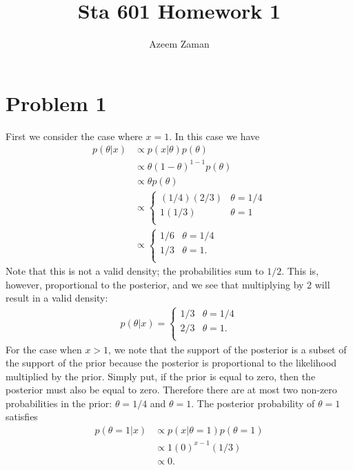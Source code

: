 \documentclass[a4paper,10pt]{article}
\title{Sta 601 Homework 1}
\author{Azeem Zaman}
\begin{document}
\maketitle

\section{Problem 1}
First we consider the case where $x=1$.  In this case we have
\begin{align*}
 p(\theta|x) &\propto p(x|\theta)p(\theta) \\
 &\propto \theta(1-\theta)^{1-1}p(\theta) \\
 &\propto \theta p(\theta) \\
  &\propto \begin{cases}
           (1/4)(2/3) & \theta = 1/4 \\
           1(1/3) & \theta = 1 \\
          \end{cases} \\
  &\propto \begin{cases}
           1/6& \theta = 1/4 \\
           1/3 & \theta = 1. \\
          \end{cases}
\end{align*}
Note that this is not a valid density; the probabilities sum to $1/2$.  This is, however, proportional to the posterior, and we see that multiplying by 2 will result in a valid density:
\begin{align*}
 p(\theta|x) = \begin{cases}
                1/3 & \theta = 1/4 \\
                2/3 & \theta = 1. \\
               \end{cases}
\end{align*}
For the case when $x>1$, we note that the support of the posterior is a subset of the support of the prior because the posterior is proportional to the likelihood multiplied by the prior.  Simply put, if the prior is equal to zero, then the posterior must also be equal to zero.  Therefore there are at most two non-zero probabilities in the prior: $\theta = 1/4$ and $\theta = 1$.  The posterior probability of $\theta = 1$ satisfies
\begin{align*}
 p(\theta = 1|x) &\propto p(x|\theta=1)p(\theta=1) \\
 &\propto 1(0)^{x-1}(1/3) \\
 &\propto 0. \\
\end{align*}
\end{document}
